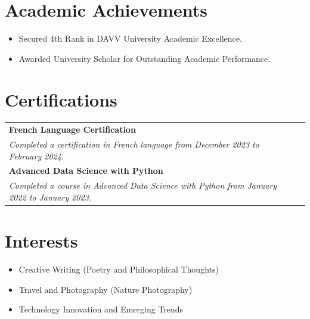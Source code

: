 \documentclass[a4paper,11pt]{article}
\begin{document}
\section{Academic Achievements}
\begin{itemize}[nosep, leftmargin=1em, itemsep=3pt, label=--]
\item Secured 4th Rank in DAVV University Academic Excellence.
\item Awarded University Scholar for Outstanding Academic Performance.
\end{itemize}


\section{Certifications}
\begin{tabularx}{\linewidth}{@{}l X@{}}

\textbf{French Language Certification}\\[2pt]
\textit{Completed a certification in French language from December 2023 to February 2024.} \\[6pt]

\textbf{Advanced Data Science with Python}\\[2pt]
\textit{Completed a course in Advanced Data Science with Python from January 2022 to January 2023.}

\end{tabularx}


\section{Interests}
\begin{itemize}[nosep, leftmargin=1em, itemsep=3pt, label=--]
\item Creative Writing (Poetry and Philosophical Thoughts)
\item Travel and Photography (Nature Photography)
\item Technology Innovation and Emerging Trends
\end{itemize}

\vfill
{}
\end{document}
